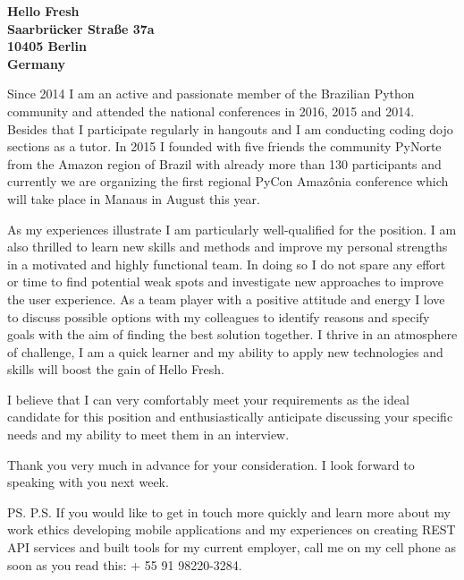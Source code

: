 \documentclass[a4paper]{joaosoares-letter}
\begin{document}
\begin{letter}{\bfseries Hello Fresh\\Saarbrücker Straße 37a\\10405  Berlin\\Germany}
{\justifying Since 2014 I am an active and passionate member of the Brazilian Python community and attended the national conferences in 2016, 2015 and 2014. Besides that I participate regularly in hangouts and I am conducting coding dojo sections as a tutor. In 2015 I founded with five friends the community PyNorte  from the Amazon region of Brazil with already more than 130 participants and currently we are organizing the first regional PyCon Amazônia conference which will take place in Manaus in August this year.\par}
{\justifying As my experiences illustrate I am particularly well-qualified for the position. I am also thrilled to learn new skills and methods and improve my personal strengths in a motivated and highly functional team. In doing so I do not spare any effort or time to find potential weak spots and investigate new approaches to improve the user experience. As a team player with a positive attitude and energy I love to discuss possible options with my colleagues to identify reasons and specify goals with the aim of finding the best solution together. I thrive in an atmosphere of challenge, I am a quick learner and my ability to apply new technologies and skills will boost the gain of Hello Fresh.\par}
{\justifying I believe that I can very comfortably meet your requirements as the ideal candidate for this position and enthusiastically anticipate discussing your specific needs and my ability to meet them in an interview.\par}


\closing{ Thank you very much in advance for your consideration. I look forward to speaking with you next week.}
\vspace{10pt}
\ps
P.S. If you would like to get in touch more quickly and learn more about my work ethics developing mobile applications and my experiences on creating REST API services and built tools for my current employer, call me on my cell phone as soon as you read this: + 55 91 98220-3284.
\vspace{\fill}

\end{letter}
\end{document}

